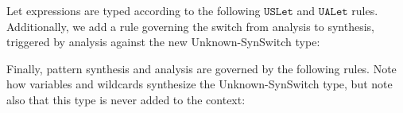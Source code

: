 Let expressions are typed according to the following $\mathtt{USLet}$ and $\mathtt{UALet}$ rules. Additionally, we add a rule governing the switch from analysis to synthesis, triggered by analysis against the new Unknown-SynSwitch type:
\begin{mathpar}
   
\end{mathpar}
Finally, pattern synthesis and analysis are governed by the following rules. Note how variables and wildcards synthesize the Unknown-SynSwitch type, but note also that this type is never added to the context:

